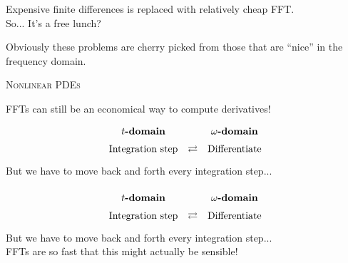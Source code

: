 \documentclass[14pt]{beamer}
\begin{document}
\begin{frame}
    \centering
    \tiny Expensive finite differences is replaced with relatively cheap FFT.\\[1em]
    \pause
    \small So... It's a free lunch?
\end{frame}

\begin{frame}
    \centering
    Obviously these problems are cherry picked from those that are ``nice''
    in the frequency domain.
\end{frame}

\begin{frame}
    \centering
    \textsc{Nonlinear PDEs}


    



\end{frame}

\begin{frame}
    \centering
    \small
    FFTs can still be an economical way to compute derivatives!\\[1em]
    $$
    \def\arraystretch{1.5}
    \begin{array}{ccc}
        t\text{\bf-domain} & & \omega\text{\bf-domain}\\
        \text{Integration step} & \rightleftarrows & \text{Differentiate}
    \end{array}
    $$
    \tiny
    But we have to move back and forth every integration step...
\end{frame}

\begin{frame}
    \centering
    $$
    \def\arraystretch{1.5}
    \begin{array}{ccc}
        t\text{\bf-domain} & & \omega\text{\bf-domain}\\
        \text{Integration step} & \rightleftarrows & \text{Differentiate}
    \end{array}
    $$
    \tiny
    But we have to move back and forth every integration step...\\[2em]

    \small
    FFTs are so fast that this might actually be sensible!
\end{frame}
\end{document}
